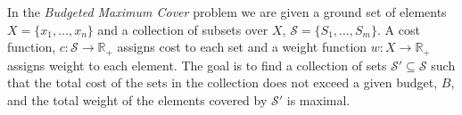 In the \emph{Budgeted Maximum Cover} problem we are given a ground set of elements 
$X = \{x_1, \dots, x_n\}$ and a collection of subsets over $X$, 
$\mathcal{S} = \{S_1, \dots, S_m\}$.
A cost function, $c:\mathcal{S} \to \mathbb{R}_+$ assigns cost to each set 
and a weight function $w:X \to \mathbb{R}_+$ assigns weight to each element. 
The goal is to find a collection of sets $\mathcal{S'} \subseteq \mathcal{S}$ such that the 
total cost of the sets in the collection does not exceed a given budget, $B$, and the 
total weight of the elements covered by $\mathcal{S'}$ is maximal.   